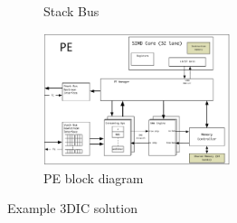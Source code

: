 \begin{figure}
\begin{subfigure}{.9\textwidth}
  \caption{Stack Bus}
  \label{fig:stackBus}
\end{subfigure}
\begin{subfigure}{.7\textwidth}
  \centering
  \includegraphics[width=0.6\textwidth]{Chapter-4/figs/PE}
  \captionsetup{justification=centering, skip=3pt}
  \caption{PE block diagram}
  \label{fig:PeBlockDiagram}
\end{subfigure}
\caption{Example 3DIC solution}
\label{fig:example 3DIC solution}
\end{figure}



